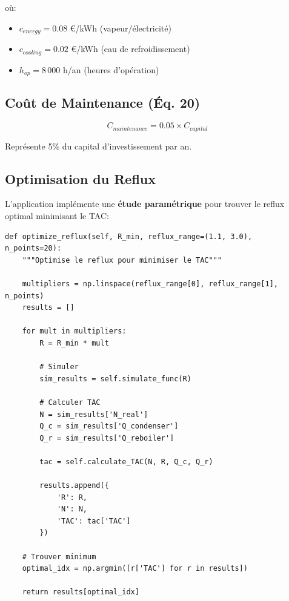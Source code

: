 \documentclass[11pt,a4paper]{article}
\begin{document}
où:
\begin{itemize}[leftmargin=*]
    \item $c_{energy} = 0.08$ €/kWh (vapeur/électricité)
    \item $c_{cooling} = 0.02$ €/kWh (eau de refroidissement)
    \item $h_{op} = 8\,000$ h/an (heures d'opération)
\end{itemize}

\subsection{Coût de Maintenance (Éq. 20)}

\begin{tcolorbox}[colback=yellow!10,colframe=orange!50!black,title=Équation 20: Coût Maintenance]
\begin{equation}
C_{maintenance} = 0.05 \times C_{capital}
\end{equation}
\end{tcolorbox}

Représente 5\% du capital d'investissement par an.

\subsection{Optimisation du Reflux}

L'application implémente une \textbf{étude paramétrique} pour trouver le reflux optimal minimisant le TAC:

\begin{lstlisting}[caption=Optimisation du reflux dans economic\_optimization.py]
def optimize_reflux(self, R_min, reflux_range=(1.1, 3.0), n_points=20):
    """Optimise le reflux pour minimiser le TAC"""

    multipliers = np.linspace(reflux_range[0], reflux_range[1], n_points)
    results = []

    for mult in multipliers:
        R = R_min * mult

        # Simuler
        sim_results = self.simulate_func(R)

        # Calculer TAC
        N = sim_results['N_real']
        Q_c = sim_results['Q_condenser']
        Q_r = sim_results['Q_reboiler']

        tac = self.calculate_TAC(N, R, Q_c, Q_r)

        results.append({
            'R': R,
            'N': N,
            'TAC': tac['TAC']
        })

    # Trouver minimum
    optimal_idx = np.argmin([r['TAC'] for r in results])

    return results[optimal_idx]
\end{lstlisting}
\end{document}

